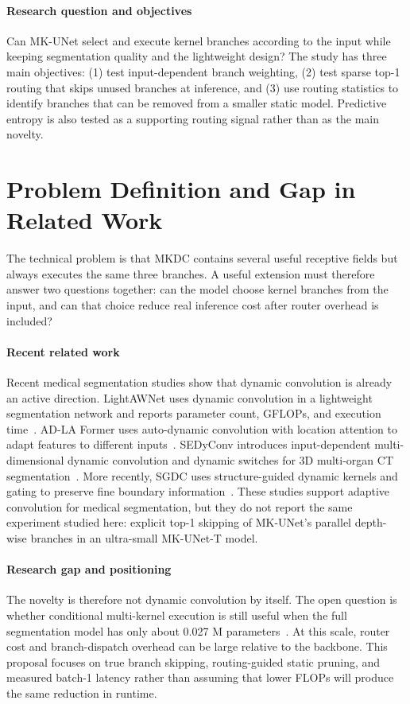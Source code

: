 \documentclass[10pt,a4paper]{article}
\begin{document}
\paragraph{Research question and objectives} Can MK-UNet select and execute kernel branches according to the input while keeping segmentation quality and the lightweight design? The study has three main objectives: (1) test input-dependent branch weighting, (2) test sparse top-1 routing that skips unused branches at inference, and (3) use routing statistics to identify branches that can be removed from a smaller static model. Predictive entropy is also tested as a supporting routing signal rather than as the main novelty.

\section{Problem Definition and Gap in Related Work}

The technical problem is that MKDC contains several useful receptive fields but always executes the same three branches. A useful extension must therefore answer two questions together: can the model choose kernel branches from the input, and can that choice reduce real inference cost after router overhead is included?

\paragraph{Recent related work} Recent medical segmentation studies show that dynamic convolution is already an active direction. LightAWNet uses dynamic convolution in a lightweight segmentation network and reports parameter count, GFLOPs, and execution time~\cite{wang2025lightawnet}. AD-LA Former uses auto-dynamic convolution with location attention to adapt features to different inputs~\cite{wang2025adlaformer}. SEDyConv introduces input-dependent multi-dimensional dynamic convolution and dynamic switches for 3D multi-organ CT segmentation~\cite{hao2025sedyconv}. More recently, SGDC uses structure-guided dynamic kernels and gating to preserve fine boundary information~\cite{shi2026sgdc}. These studies support adaptive convolution for medical segmentation, but they do not report the same experiment studied here: explicit top-1 skipping of MK-UNet's parallel depth-wise branches in an ultra-small MK-UNet-T model.

\paragraph{Research gap and positioning} The novelty is therefore not dynamic convolution by itself. The open question is whether conditional multi-kernel execution is still useful when the full segmentation model has only about 0.027 M parameters~\cite{rahman2025mkunet}. At this scale, router cost and branch-dispatch overhead can be large relative to the backbone. This proposal focuses on true branch skipping, routing-guided static pruning, and measured batch-1 latency rather than assuming that lower FLOPs will produce the same reduction in runtime.
\end{document}
